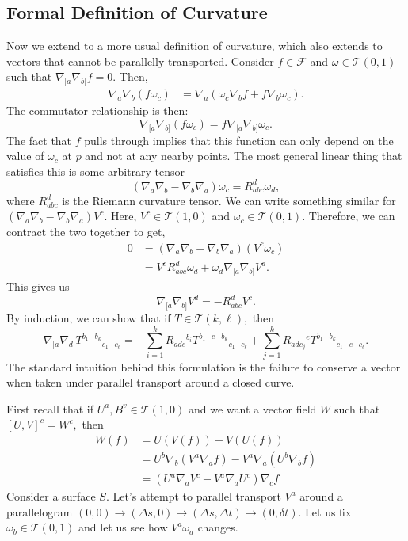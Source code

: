 \documentclass{article}
\numberwithin{equation}{section}
\begin{document}
\subsection*{Formal Definition of Curvature}
Now we extend to a more usual definition of curvature, which also extends to vectors that cannot be parallelly transported. Consider $f\in \mathcal{F}$ and $\omega \in \mathcal{T}(0,1)$ such that $\nabla_{[a}\nabla_{b]}f=0.$ Then,
\begin{align*}
    \nabla_a\nabla_b(f\omega_c) &= \nabla_a(\omega_c\nabla_b f + f\nabla_b \omega_c).
\end{align*}
The commutator relationship is then:
\begin{equation*}
    \nabla_{[a}\nabla_{b]}(f\omega_c) = f\nabla_{[a}\nabla_{b]}\omega_c.
\end{equation*}
The fact that $f$ pulls through implies that this function can only depend on the value of $\omega_c$ at $p$ and not at any nearby points. The most general linear thing that satisfies this is some arbitrary tensor 
\begin{equation*}
    (\nabla_a\nabla_b - \nabla_b\nabla_a)\omega_c = R_{abc}^d\omega_d,
\end{equation*}
where $R_{abc}^d$ is the Riemann curvature tensor. We can write something similar for $(\nabla_a\nabla_b - \nabla_b\nabla_a)V^c.$ Here, $V^c \in \mathcal{T}(1,0)$ and $\omega_c \in \mathcal{T}(0,1).$ Therefore, we can contract the two together to get,
\begin{align*}
    0 &= (\nabla_a\nabla_b - \nabla_b\nabla_a)(V^c\omega_c) \\ 
    &= V^c R_{abc}^d\omega_d + \omega_d \nabla_{[a}\nabla_{b]}V^d.
\end{align*}
This gives us 
\begin{equation*}
    \nabla_{[a}\nabla_{b]}V^d = -R_{abc}^dV^c.
\end{equation*}
By induction, we can show that if $T\in \mathcal{T}(k,\ell),$ then
\begin{equation*}
    \nabla_{[a}\nabla_{d]} T^{b_1\cdots b_k}{}_{c_1\cdots c_\ell} = -\sum_{i=1}^k R_{ade}{}^{b_i}T^{b_1\cdots e\cdots b_k}{}_{c_1\cdots c_\ell} + \sum_{j=1}^k R_{adc_j}{}^{e}T^{b_1\cdots b_k}{}_{c_1\cdots e\cdots c_\ell}.
\end{equation*}
The standard intuition behind this formulation is the failure to conserve a vector when taken under parallel transport around a closed curve.

First recall that if $U^a,B^v \in \mathcal{T}(1,0)$ and we want a vector field $W$ such that $[U,V]^c = W^c,$ then 
\begin{align*}
    W(f) &=  U(V(f)) - V(U(f)) \\ 
    &= U^b \nabla_b(V^a\nabla_a f) - V^a\nabla_a(U^b\nabla_b f) \\ 
    &= (U^a\nabla_a V^c - V^a \nabla_a U^c) \nabla_c f
\end{align*}
Consider a surface $S.$ Let's attempt to parallel transport $V^a$ around a parallelogram $(0,0) \to (\Delta s, 0) \to (\Delta s, \Delta t) \to (0,\delta t).$ Let us fix $\omega_b \in \mathcal{T}(0,1)$ and let us see how $V^a\omega_a$ changes.
\end{document}
